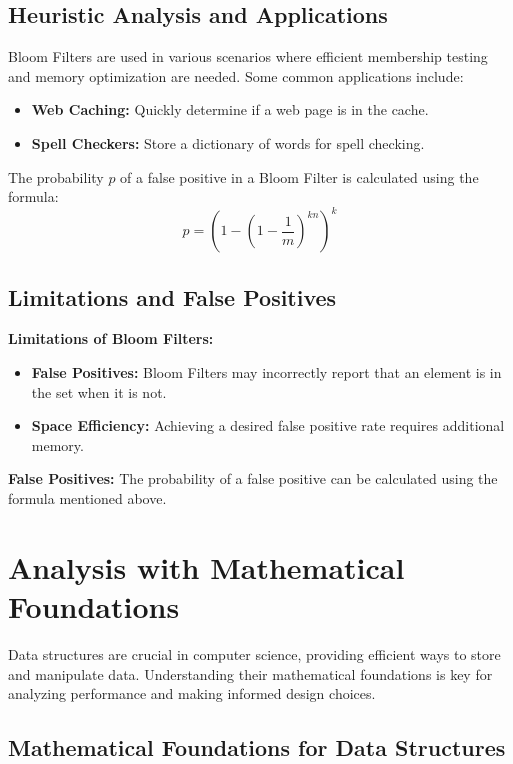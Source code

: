 \documentclass[12pt]{book} %
\begin{document}
\subsection{Heuristic Analysis and Applications}
Bloom Filters are used in various scenarios where efficient membership testing and memory optimization are needed. Some common applications include:

\begin{itemize}
    \item \textbf{Web Caching:} Quickly determine if a web page is in the cache.
    \item \textbf{Spell Checkers:} Store a dictionary of words for spell checking.
\end{itemize}

The probability \( p \) of a false positive in a Bloom Filter is calculated using the formula:
\[ p = \left(1 - \left(1 - \frac{1}{m}\right)^{kn}\right)^k \]

\subsection{Limitations and False Positives}
\textbf{Limitations of Bloom Filters:}
\begin{itemize}
    \item \textbf{False Positives:} Bloom Filters may incorrectly report that an element is in the set when it is not.
    \item \textbf{Space Efficiency:} Achieving a desired false positive rate requires additional memory.
\end{itemize}

\textbf{False Positives:} The probability of a false positive can be calculated using the formula mentioned above.


\section{Analysis with Mathematical Foundations}
Data structures are crucial in computer science, providing efficient ways to store and manipulate data. Understanding their mathematical foundations is key for analyzing performance and making informed design choices.

\subsection{Mathematical Foundations for Data Structures}
\end{document}
